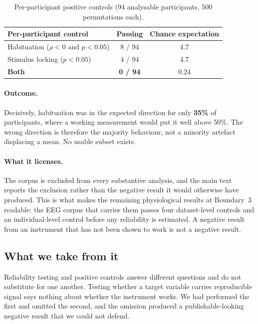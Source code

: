 \begin{table}[htbp]
\centering\small
\caption{Per-participant positive controls (94 analysable participants,
500 permutations each).}
\begin{tabular}{lcc}
\toprule
Per-participant control & Passing & Chance expectation \\
\midrule
Habituation ($\rho < 0$ and $p < 0.05$) & 8 / 94 & 4.7 \\
Stimulus locking ($p < 0.05$)           & 4 / 94 & 4.7 \\
\textbf{Both}                           & \textbf{0 / 94} & 0.24 \\
\bottomrule
\end{tabular}
\end{table}

\paragraph{Outcome.}
Decisively, habituation was in the expected direction for only \textbf{35\%} of
participants, where a working measurement would put it well above 50\%. The wrong
direction is therefore the majority behaviour, not a minority artefact displacing a
mean. No usable subset exists.

\paragraph{What it licenses.}
The corpus is excluded from every substantive analysis, and the main text reports the
exclusion rather than the negative result it would otherwise have produced. This is
what makes the remaining physiological results at Boundary~3 readable: the EEG corpus
that carries them passes four dataset-level controls and an individual-level control
before any reliability is estimated. A negative result from an instrument that has not
been shown to work is not a negative result.

\subsection{What we take from it}

Reliability testing and positive controls answer different questions and do not
substitute for one another. Testing whether a target variable carries reproducible
signal says nothing about whether the instrument works. We had performed the first
and omitted the second, and the omission produced a publishable-looking negative
result that we could not defend.

